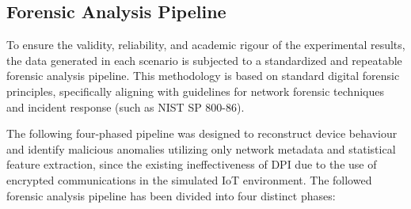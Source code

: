 \subsection{Forensic Analysis Pipeline}

To ensure the validity, reliability, and academic rigour of the experimental results, the data generated in each scenario is subjected to a standardized and repeatable forensic analysis pipeline. This methodology is based on standard digital forensic principles, specifically aligning with guidelines for network forensic techniques and incident response (such as NIST SP 800-86). 

The following four-phased pipeline was designed to reconstruct device behaviour and identify malicious anomalies utilizing only network metadata and statistical feature extraction, since the existing ineffectiveness of DPI due to the use of encrypted communications in the simulated IoT environment. The followed forensic analysis pipeline has been divided into four distinct phases:

